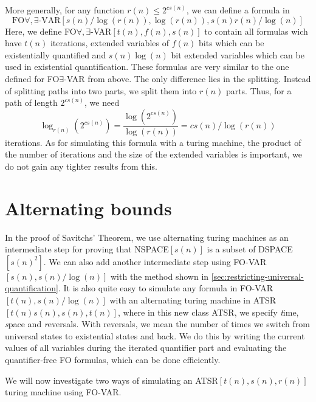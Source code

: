 More generally, for any function $r(n) \leq 2^{cs(n)}$, we can define a formula in \[\text{FO$\forall, \exists$-VAR$[s(n)/\log(r(n)), \log(r(n)), s(n)r(n)/\log(n)]$}\]
Here, we define FO$\forall, \exists$-VAR$[t(n), f(n), s(n)]$ to contain all formulas wich have $t(n)$ iterations, extended variables of $f(n)$ bits which can be existentially quantified and $s(n)\log(n)$ bit extended variables which can be used in existential quantification.
These formulas are very similar to the one defined for FO$\exists$-VAR from above.
The only difference lies in the splitting.
Instead of splitting paths into two parts, we split them into $r(n)$ parts.
Thus, for a path of length $2^{cs(n)}$, we need \[\log_{r(n)}\left(2^{cs(n)}\right) = \frac{\log\left(2^{cs(n)}\right)}{\log(r(n))} = cs(n)/\log(r(n))\] iterations.
As for simulating this formula with a turing machine, the product of the number of iterations and the size of the extended variables is important, we do not gain any tighter results from this.

\section{Alternating bounds}\label{sec:alternating-bounds}

In the proof of Savitchs' Theorem, we use alternating turing machines as an intermediate step for proving that NSPACE$[s(n)]$ is a subset of DSPACE$[s(n)^2]$.
We can also add another intermediate step using FO-VAR$[s(n), s(n)/\log(n)]$ with the method shown in \cref{sec:restricting-universal-quantification}.
It is also quite easy to simulate any formula in FO-VAR$[t(n), s(n)/\log(n)]$ with an alternating turing machine in ATSR$[t(n)s(n), s(n), t(n)]$, where in this new class ATSR, we specify \emph{t}ime, \emph{s}pace and \emph{r}eversals.
With reversals, we mean the number of times we switch from universal states to existential states and back.
We do this by writing the current values of all variables during the iterated quantifier part and evaluating the quantifier-free FO formulas, which can be done efficiently.

We will now investigate two ways of simulating an ATSR$[t(n), s(n), r(n)]$ turing machine using FO-VAR\@.

